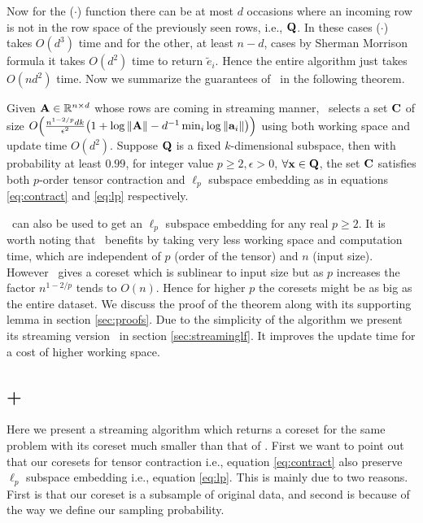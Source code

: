 Now for the \oscore($\cdot$) function there can be at most $d$ occasions where an incoming row is not in the row space of the previously seen rows, i.e., $\mathbf{Q}$. In these cases \oscore($\cdot$) takes $O(d^{3})$ time and for the other, at least $n-d$, cases by Sherman Morrison formula it takes $O(d^{2})$ time to return $\tilde{e}_{i}$. Hence the entire algorithm just takes $O(nd^{2})$ time. Now we summarize the guarantees of \online~in the following theorem.
\begin{theorem}\label{thm:Online}
Given $\mathbf{A} \in \mathbb{R}^{n \times d}$ whose rows are coming in streaming manner, \online~selects a set $\mathbf{C}$ of size $O\Big(\frac{n^{1-2/p}dk}{\epsilon^{2}}\big(1+\log\|\mathbf{A}\|-d^{-1}\min_{i} \log \|\mathbf{a}_{i}\|\big)\Big)$ using both working space and update time $O(d^2)$. Suppose $\mathbf{Q}$ is a fixed $k$-dimensional subspace, then with probability at least $0.99$, for integer value $p \geq 2, \epsilon > 0$, $\forall \mathbf{x} \in \mathbf{Q}$, the set $\mathbf{C}$ satisfies both $p$-order tensor contraction and $\ell_{p}$ subspace embedding as in equations \eqref{eq:contract} and \eqref{eq:lp} respectively.
\end{theorem}
\online~can also be used to get an $\ell_{p}$ subspace embedding for any real $p \geq 2$. It is worth noting that \online~benefits by taking very less working space and computation time, which are independent of $p$ (order of the tensor) and $n$ (input size). However \online~gives a coreset which is sublinear to input size but as $p$ increases the factor $n^{1-2/p}$ tends to $O(n)$. Hence for higher $p$ the coresets might be as big as the entire dataset. We discuss the proof of the theorem along with its supporting lemma in section \ref{sec:proofs}. Due to the simplicity of the algorithm we present its streaming version \mrlf~in section \ref{sec:streaminglf}. It improves the update time for a cost of higher working space.
% 
\subsection{\online+\mrlw}
Here we present a streaming algorithm which returns a coreset for the same problem with its coreset much smaller than that of \online. First we want to point out that our coresets for tensor contraction i.e., equation \eqref{eq:contract} also preserve $\ell_p$ subspace embedding i.e., equation \eqref{eq:lp}. This is mainly due to two reasons. First is that our coreset is a subsample of original data, and second is because of the way we define our sampling probability.  

